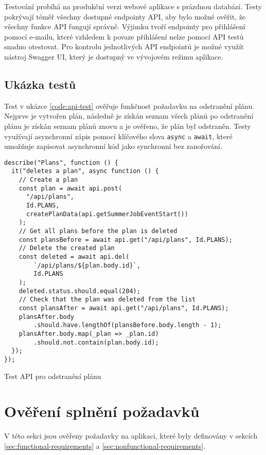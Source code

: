 Testování probíhá na produkční verzi webové aplikace s prázdnou databází. Testy pokrývají téměř všechny dostupné endpointy API, aby bylo možné
ověřit, že všechny funkce API fungují správně. Výjimku tvoří endpointy pro přihlášení pomocí e-mailu, které vzhledem k povaze přihlášení nelze 
pomocí API testů snadno otestovat. Pro kontrolu jednotlivých API endpointů je možné využít nástroj Swagger UI, který je dostupný ve vývojovém režimu aplikace.

\subsection{Ukázka testů}

Test v ukázce \ref{code:api-test} ověřuje funkčnost požadavku na odstranění plánu.
Nejprve je vytvořen plán, následně je získán seznam všech plánů po odstranění plánu je získán seznam plánů znovu a je ověřeno, že plán byl odstraněn.
Testy využívají asynchronní zápis pomocí klíčového slova \texttt{async} a \texttt{await}, které umožňuje zapisovat asynchronní kód jako synchronní bez zanořování.


\begin{listing}[h]
\begin{verbatim}
describe("Plans", function () {
  it("deletes a plan", async function () {
    // Create a plan
    const plan = await api.post(
      "/api/plans",
      Id.PLANS,
      createPlanData(api.getSummerJobEventStart())
    );
    // Get all plans before the plan is deleted
    const plansBefore = await api.get("/api/plans", Id.PLANS);
    // Delete the created plan
    const deleted = await api.del(
        `/api/plans/${plan.body.id}`,
        Id.PLANS
    );
    deleted.status.should.equal(204);
    // Check that the plan was deleted from the list
    const plansAfter = await api.get("/api/plans", Id.PLANS);
    plansAfter.body
        .should.have.lengthOf(plansBefore.body.length - 1);
    plansAfter.body.map(_plan => _plan.id)
        .should.not.contain(plan.body.id);
  });
});
\end{verbatim}
\caption{Test API pro odstranění plánu}
\label{code:api-test}
\end{listing}

\section{Ověření splnění požadavků}

V této sekci jsou ověřeny požadavky na aplikaci, které byly definovány v sekcích \ref{sec:functional-requirements} a \ref{sec:nonfunctional-requirements}.


